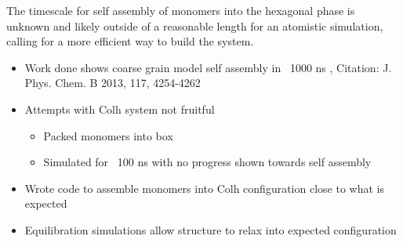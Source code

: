\documentclass{article}
\begin{document}
\begin{itemize}
	The timescale for self assembly of monomers into the hexagonal phase is unknown and likely outside of a reasonable length for an atomistic simulation, calling for a more efficient way to build the system. 
	\begin{itemize}
		\item Work done shows coarse grain model self assembly in ~1000 ns , Citation: J. Phys. Chem. B 2013, 117, 4254-4262
		\item Attempts with Colh system not fruitful  
		\begin{itemize}
			\item Packed monomers into box
			\item Simulated for ~100 ns with no progress shown towards self assembly
		\end{itemize}  
		\item Wrote code to assemble monomers into Colh configuration close to what is expected 
		\item Equilibration simulations allow structure to relax into expected configuration 
	\end{itemize}
	

\end{itemize}
\end{document}
